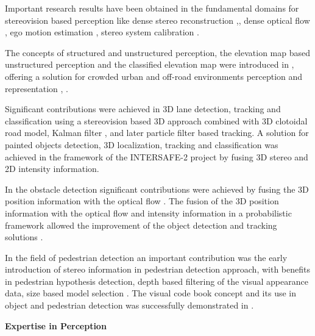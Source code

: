 Important research results have been obtained in the fundamental domains for stereovision based perception like dense stereo reconstruction \cite{utc-Pantilie},\cite{utc-Haller}, dense optical flow \cite{utc-Drulea}, ego motion estimation \cite{utc-Szakats}, stereo system calibration \cite{utc-Nedevschi-calibration}.

The concepts of structured and unstructured perception, the elevation map based unstructured perception and the classified elevation map were introduced in \cite{utc-Nedevschi-ASensor}, \cite{utc-Oniga-ProcessingDense} offering a solution for crowded urban and off-road environments perception and representation \cite{utc-Danescu-Modeling}, \cite{utc-Danescu-AParticle}.

Significant contributions were achieved in 3D lane detection, tracking and classification using a stereovision based 3D approach combined with 3D clotoidal road model, Kalman filter \cite{utc-Nedevschi-HighAccuracy}, \cite{utc-Nedevschi-3DLane} and later particle filter \cite{utc-Danescu-ProbabilisticLane} based tracking. A solution for painted objects detection, 3D localization, tracking and classification was achieved in the framework of the INTERSAFE-2 project \cite{utc-Danescu-Detection} by fusing 3D stereo and 2D intensity information.

In the obstacle detection significant contributions were achieved by fusing the 3D position information with the optical flow \cite{utc-Nedevschi-OnBoard} \cite{utc-Pantilie-RealTime}. The fusion of the 3D position information with the optical flow and intensity information in a probabilistic framework allowed the improvement of the object detection \cite{utc-Giosan-Superpixels} and tracking solutions \cite{utc-Bota}.

In the field of pedestrian detection an important contribution was the early introduction of stereo information in pedestrian detection approach, with benefits in pedestrian hypothesis detection, depth based filtering of the visual appearance data, size based model selection \cite{utc-Nedevschi-Stereo}.
The visual code book concept and its use in object and pedestrian detection was successfully demonstrated in \cite{utc-Costea-WordChannel}.  



{\bf Expertise in Perception}


\begingroup
\color{blue}

